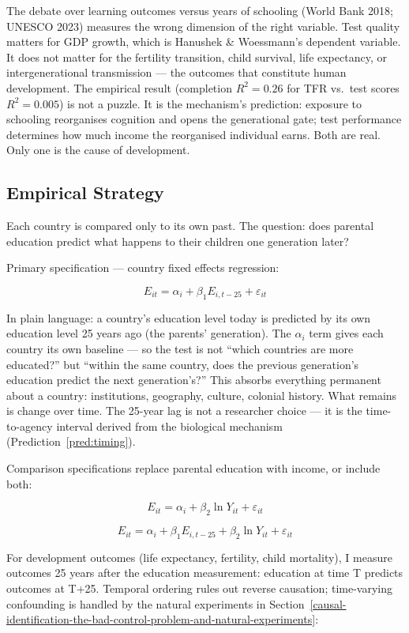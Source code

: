\documentclass[12pt,letterpaper]{article}
\begin{document}
The debate over learning outcomes versus years of schooling (World Bank 2018;
UNESCO 2023) measures the wrong dimension of the right variable. Test
quality matters for GDP growth, which is Hanushek \& Woessmann's dependent
variable. It does not matter for the fertility transition, child survival,
life expectancy, or intergenerational transmission --- the outcomes that
constitute human development. The empirical result (completion $R^2 = 0.26$
for TFR vs.\ test scores $R^2 = 0.005$) is not a puzzle. It is the mechanism's
prediction: exposure to schooling reorganises cognition and opens the
generational gate; test performance determines how much income the reorganised
individual earns. Both are real. Only one is the cause of development.

\subsection{Empirical Strategy}\label{empirical-strategy}

Each country is compared only to its own past. The question: does parental education predict what happens to their children one generation later?

Primary specification --- country fixed effects regression:

\[E_{it} = \alpha_i + \beta_1 E_{i,t-25} + \varepsilon_{it}\]

In plain language: a country's education level today is predicted by its own education level 25 years ago (the parents' generation). The $\alpha_i$ term gives each country its own baseline --- so the test is not ``which countries are more educated?'' but ``within the same country, does the previous generation's education predict the next generation's?'' This absorbs everything permanent about a country: institutions, geography, culture, colonial history. What remains is change over time. The 25-year lag is not a researcher choice --- it is the time-to-agency interval derived from the biological mechanism (Prediction~\ref{pred:timing}).

Comparison specifications replace parental education with income, or include both:

\[E_{it} = \alpha_i + \beta_2 \ln Y_{it} + \varepsilon_{it}\]

\[E_{it} = \alpha_i + \beta_1 E_{i,t-25} + \beta_2 \ln Y_{it} + \varepsilon_{it}\]

For development outcomes (life expectancy, fertility, child mortality), I measure outcomes 25 years after the education measurement: education at time T predicts outcomes at T+25. Temporal ordering rules out reverse causation; time-varying confounding is handled by the natural experiments in Section~\ref{causal-identification-the-bad-control-problem-and-natural-experiments}:
\end{document}
